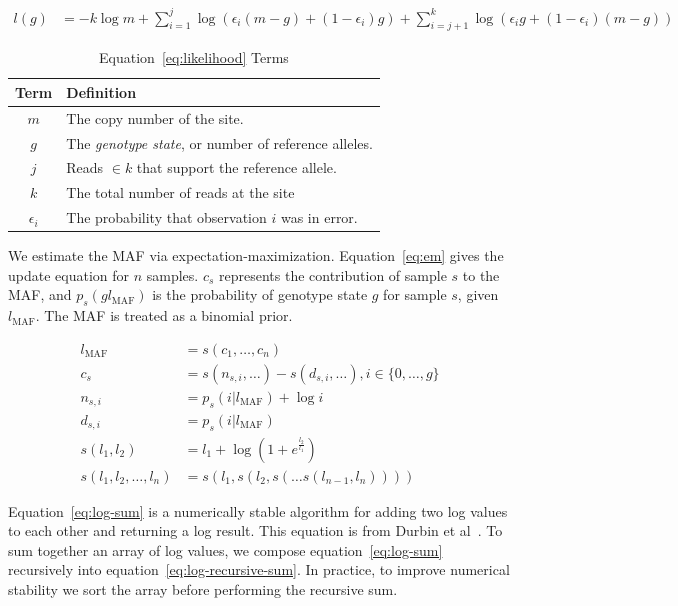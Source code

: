 \documentclass[masters]{ucbthesis}
\begin{document}
\begin{align}
\label{eq:likelihood}
l(g) &= -k \log m + \sum_{i = 1}^{j} \log(\epsilon_i (m - g) + (1 - \epsilon_i) g) + \sum_{i = j + 1}^{k} \log(\epsilon_i g + (1 - \epsilon_i) (m - g))
\end{align}

\begin{table}[h]
\begin{center}
\caption{Equation~\eqref{eq:likelihood} Terms}
\label{tab:likelihood-terms}
\begin{tabular}{| c | l |}
\hline
Term & Definition \\
\hline
\hline
$m$ & The copy number of the site. \\
$g$ & The \emph{genotype state}, or number of reference alleles. \\
$j$ & Reads $\in k$ that support the reference allele. \\
$k$ & The total number of reads at the site \\
$\epsilon_i$ & The probability that observation $i$ was in error. \\
\hline
\end{tabular}
\end{center}
\end{table}

We estimate the MAF via expectation-maximization. Equation~\eqref{eq:em} gives the update equation for $n$ samples.
$c_s$ represents the contribution of sample $s$ to the MAF, and $p_s(g l_{\text{MAF}})$ is the
probability of genotype state $g$ for sample $s$, given $l_{\text{MAF}}$. The MAF is treated as a binomial prior.

\begin{align}
\label{eq:em}
l_{\text{MAF}} &= s(c_1, \dots, c_n) \\
c_s &= s(n_{s, i}, \dots) - s(d_{s, i}, \dots), i \in \{0, \dots, g\} \\
n_{s, i} &= p_s(i | l_{\text{MAF}}) + \log i \\
d_{s, i} &= p_s(i | l_{\text{MAF}}) \\
\label{eq:log-sum}
s(l_1, l_2) &= l_1 + \log(1 + e^\frac{l_2}{l_1}) \\
\label{eq:log-recursive-sum}
s(l_1, l_2, \dots , l_n) &= s(l_1, s(l_2, s( \dots s(l_{n - 1}, l_n))))
\end{align}

Equation~\eqref{eq:log-sum} is a numerically stable algorithm for adding two log values to each other and
returning a log result. This equation is from Durbin et al~\cite{durbin98}. To sum together an array of log values, we
compose equation~\eqref{eq:log-sum} recursively into equation~\eqref{eq:log-recursive-sum}. In practice, to improve
numerical stability we sort the array before performing the recursive sum.
\end{document}
